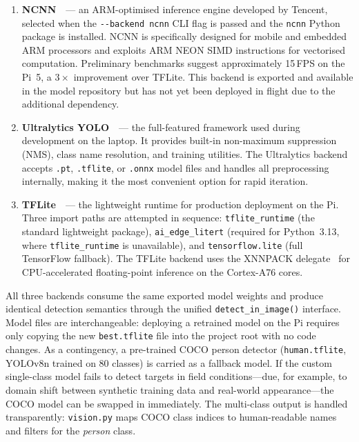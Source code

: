\begin{enumerate}
    \item \textbf{NCNN}~\cite{ncnn}~--- an ARM-optimised inference engine developed by Tencent, selected when the \texttt{-{}-backend ncnn} CLI flag is passed and the \texttt{ncnn} Python package is installed. NCNN is specifically designed for mobile and embedded ARM processors and exploits ARM NEON SIMD instructions for vectorised computation. Preliminary benchmarks suggest approximately 15\,FPS on the Pi~5, a $3\times$ improvement over TFLite. This backend is exported and available in the model repository but has not yet been deployed in flight due to the additional dependency.

    \item \textbf{Ultralytics YOLO}~\cite{yolov8}~--- the full-featured framework used during development on the laptop. It provides built-in non-maximum suppression (NMS), class name resolution, and training utilities. The Ultralytics backend accepts \texttt{.pt}, \texttt{.tflite}, or \texttt{.onnx} model files and handles all preprocessing internally, making it the most convenient option for rapid iteration.

    \item \textbf{TFLite}~\cite{tflite}~--- the lightweight runtime for production deployment on the Pi. Three import paths are attempted in sequence: \texttt{tflite\_runtime} (the standard lightweight package), \texttt{ai\_edge\_litert} (required for Python~3.13, where \texttt{tflite\_runtime} is unavailable), and \texttt{tensorflow.lite} (full TensorFlow fallback). The TFLite backend uses the XNNPACK delegate~\cite{xnnpack} for CPU-accelerated floating-point inference on the Cortex-A76 cores.
\end{enumerate}

All three backends consume the same exported model weights and produce identical detection semantics through the unified \texttt{detect\_in\_image()} interface. Model files are interchangeable: deploying a retrained model on the Pi requires only copying the new \texttt{best.tflite} file into the project root with no code changes. As a contingency, a pre-trained COCO person detector (\texttt{human.tflite}, YOLOv8n trained on 80 classes) is carried as a fallback model. If the custom single-class model fails to detect targets in field conditions---due, for example, to domain shift between synthetic training data and real-world appearance---the COCO model can be swapped in immediately. The multi-class output is handled transparently: \texttt{vision.py} maps COCO class indices to human-readable names and filters for the \textit{person} class.

